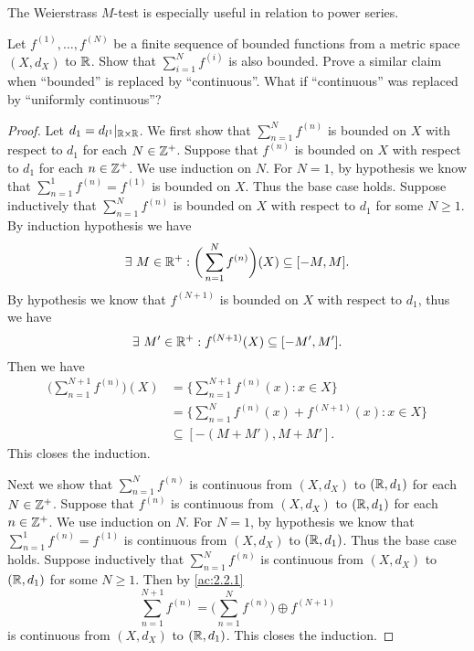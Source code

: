 \begin{note}
  The Weierstrass \(M\)-test is especially useful in relation to power series.
\end{note}

\exercisesection

\begin{ex}\label{ex:3.5.1}
  Let \(f^{(1)}, \dots, f^{(N)}\) be a finite sequence of bounded functions from a metric space \((X, d_X)\) to \(\mathbb{R}\).
  Show that \(\sum_{i = 1}^N f^{(i)}\) is also bounded.
  Prove a similar claim when ``bounded'' is replaced by ``continuous''.
  What if ``continuous'' was replaced by ``uniformly continuous''?
\end{ex}

\begin{proof}
  Let \(d_1 = d_{l^1}|_{\mathbb{R} \times \mathbb{R}}\).
  We first show that \(\sum_{n = 1}^N f^{(n)}\) is bounded on \(X\) with respect to \(d_1\) for each \(N \in \mathbb{Z}^+\).
  Suppose that \(f^{(n)}\) is bounded on \(X\) with respect to \(d_1\) for each \(n \in \mathbb{Z}^+\).
  We use induction on \(N\).
  For \(N = 1\), by hypothesis we know that \(\sum_{n = 1}^1 f^{(n)} = f^{(1)}\) is bounded on \(X\).
  Thus the base case holds.
  Suppose inductively that \(\sum_{n = 1}^N f^{(n)}\) is bounded on \(X\) with respect to \(d_1\) for some \(N \geq 1\).
  By induction hypothesis we have
  \[
    \exists\ M \in \mathbb{R}^+ : \bigg(\sum_{n = 1}^N f^{(n)}\bigg)(X) \subseteq [-M, M].
  \]
  By hypothesis we know that \(f^{(N + 1)}\) is bounded on \(X\) with respect to \(d_1\), thus we have
  \[
    \exists\ M' \in \mathbb{R}^+ : f^{(N + 1)}(X) \subseteq [-M', M'].
  \]
  Then we have
  \begin{align*}
    \bigg(\sum_{n = 1}^{N + 1} f^{(n)}\bigg)(X) & = \bigg\{\sum_{n = 1}^{N + 1} f^{(n)}(x) : x \in X\bigg\}            \\
                                                & = \bigg\{\sum_{n = 1}^N f^{(n)}(x) + f^{(N + 1)}(x) : x \in X\bigg\} \\
                                                & \subseteq [-(M + M'), M + M'].
  \end{align*}
  This closes the induction.

  Next we show that \(\sum_{n = 1}^N f^{(n)}\) is continuous from \((X, d_X)\) to \((\mathbb{R}, d_1)\) for each \(N \in \mathbb{Z}^+\).
  Suppose that \(f^{(n)}\) is continuous from \((X, d_X)\) to \((\mathbb{R}, d_1)\) for each \(n \in \mathbb{Z}^+\).
  We use induction on \(N\).
  For \(N = 1\), by hypothesis we know that \(\sum_{n = 1}^1 f^{(n)} = f^{(1)}\) is continuous from \((X, d_X)\) to \((\mathbb{R}, d_1)\).
  Thus the base case holds.
  Suppose inductively that \(\sum_{n = 1}^N f^{(n)}\) is continuous from \((X, d_X)\) to \((\mathbb{R}, d_1)\) for some \(N \geq 1\).
  Then by \cref{ac:2.2.1}
  \[
    \sum_{n = 1}^{N + 1} f^{(n)} = \bigg(\sum_{n = 1}^N f^{(n)}\bigg) \oplus f^{(N + 1)}
  \]
  is continuous from \((X, d_X)\) to \((\mathbb{R}, d_1)\).
  This closes the induction.


\end{proof}
